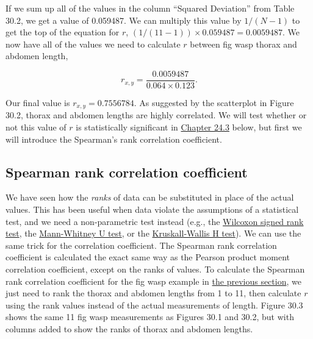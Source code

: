 \documentclass[
]{scrbook}
\begin{document}
If we sum up all of the values in the column ``Squared Deviation'' from Table 30.2, we get a value of 0.059487.
We can multiply this value by \(1 / (N - 1)\) to get the top of the equation for \(r\), \((1 / (11-1)) \times 0.059487 = 0.0059487\).
We now have all of the values we need to calculate \(r\) between fig wasp thorax and abdomen length,

\[r_{x,y} = \frac{0.0059487}{0.064 \times 0.123}.\]

Our final value is \(r_{x, y} = 0.7556784\).
As suggested by the scatterplot in Figure 30.2, thorax and abdomen lengths are highly correlated.
We will test whether or not this value of \(r\) is statistically significant in \protect\hyperlink{correlation-hypothesis-testing}{Chapter 24.3} below, but first we will introduce the Spearman's rank correlation coefficient.

\hypertarget{spearman-rank-correlation-coefficient}{%
\subsection{Spearman rank correlation coefficient}\label{spearman-rank-correlation-coefficient}}

We have seen how the \emph{ranks} of data can be substituted in place of the actual values.
This has been useful when data violate the assumptions of a statistical test, and we need a non-parametric test instead (e.g., the \protect\hyperlink{wilcoxon-test-1}{Wilcoxon signed rank test}, the \protect\hyperlink{mann-whitney-u-test-1}{Mann-Whitney U test}, or the \protect\hyperlink{Chapter_26}{Kruskall-Wallis H test}).
We can use the same trick for the correlation coefficient.
The Spearman rank correlation coefficient is calculated the exact same way as the Pearson product moment correlation coefficient, except on the ranks of values.
To calculate the Spearman rank correlation coefficient for the fig wasp example in \protect\hyperlink{pearson-product-moment-correlation-coefficient}{the previous section}, we just need to rank the thorax and abdomen lengths from 1 to 11, then calculate \(r\) using the rank values instead of the actual measurements of length.
Figure 30.3 shows the same 11 fig wasp measurements as Figures 30.1 and 30.2, but with columns added to show the ranks of thorax and abdomen lengths.
\end{document}
